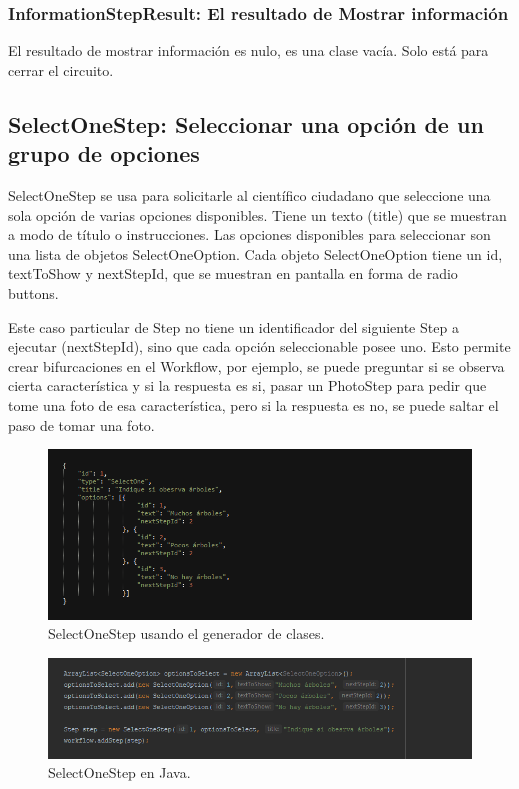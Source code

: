 \subsubsection{InformationStepResult: El resultado de Mostrar información}
El resultado de mostrar información es nulo, es una clase vacía. Solo está para cerrar el circuito.





\subsection{SelectOneStep: Seleccionar una opción de un grupo de opciones}
SelectOneStep  se usa para solicitarle al científico ciudadano que seleccione una sola opción de varias opciones disponibles. Tiene un texto (title) que se muestran a modo de título o instrucciones. Las opciones disponibles para seleccionar son una lista de objetos SelectOneOption.
Cada objeto SelectOneOption tiene un id, textToShow y nextStepId, que se muestran en pantalla en forma de radio buttons.

Este caso particular de Step no tiene un identificador del siguiente Step a ejecutar (nextStepId), sino que cada opción seleccionable posee uno. Esto permite crear bifurcaciones en el Workflow, por ejemplo, se puede preguntar si se observa cierta característica y si la respuesta es si, pasar un PhotoStep para pedir que tome una foto de esa característica, pero si la respuesta es no, se puede saltar el paso de tomar una foto.

\begin{figure}[H]
  \centering
    \includegraphics[scale=0.6]{50-anexos/C-steps/select_one_json.png} 
    \caption{SelectOneStep usando el generador de clases.}
\end{figure}	

\begin{figure}[H]
  \centering
    \includegraphics[scale=0.6]{50-anexos/C-steps/select_one_java.png} 
    \caption{SelectOneStep en Java.}
\end{figure}

